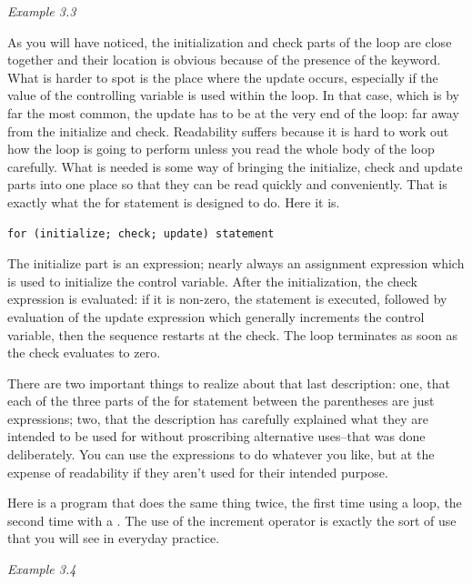    \begin{center}\textit{Example 3.3}\end{center}


   As you will have noticed, the initialization and check parts of the loop
    are close together and their location is obvious because of the presence
    of the \while{} keyword. What is harder to spot is the place
    where the update occurs, especially if the value of the controlling
    variable is used within the loop. In that case, which is by far the most
    common, the update has to be at the very end of the loop: far away from
    the initialize and check. Readability suffers because it is hard to work
    out how the loop is going to perform unless you read the whole body of the
    loop carefully. What is needed is some way of bringing the initialize,
    check and update parts into one place so that they can be read quickly and
    conveniently. That is exactly what the for statement is designed to do.
    Here it is.


   \begin{Verbatim}
for (initialize; check; update) statement
\end{Verbatim}

   The initialize part is an expression; nearly always an
    assignment expression which is used to initialize the control variable.
    After the initialization, the check expression is evaluated: if
    it is non-zero, the statement is executed, followed by evaluation of the
    update expression which generally increments the control variable, then
    the sequence restarts at the check. The loop terminates as soon as the
    check evaluates to zero.


   There are two important things to realize about that last description:
    one, that each of the three parts of the for statement between the
    parentheses are just expressions; two, that the description has carefully
    explained what they are intended to be used for without proscribing
    alternative uses--that was done deliberately. You can use the
    expressions to do whatever you like, but at the expense of readability if
    they aren't used for their intended purpose.


   Here is a program that does the same thing twice, the first time using a
    \while{} loop, the second time with a \for. The use
    of the increment operator is exactly the sort of use that you will see in
    everyday practice.


    \begin{center}
      \textit{Example 3.4}\end{center}


